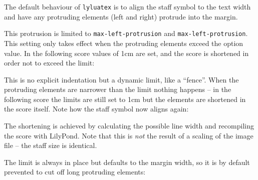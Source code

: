 \documentclass{scrartcl}
\begin{document}
The default behaviour of \texttt{lyluatex} is to align the staff symbol to the
text width and have any protruding elements (left and right) protrude into the
margin.


This protrusion is limited to \texttt{max-left-protrusion} and
\texttt{max-left-protrusion}.  This setting only takes effect when the
protruding elements exceed the option value.  In the following score values of
1cm are set, and the score is shortened in order not to exceed the limit:


This is no explicit indentation but a dynamic limit, like a “fence”. When the
protruding elements are narrower than the limit nothing happens -- in the
following score the limits are still set to 1cm but the elements are shortened
in the score itself.  Note how the staff symbol now aligns again:


\bigskip
The shortening is achieved by calculating the possible line width and
recompiling the score with LilyPond.  Note that this is \emph{not} the result of
a scaling of the image file -- the staff size is identical.


\bigskip
The limit is always in place but defaults to the margin width, so it is by default prevented to cut off long protruding elements:

\end{document}
